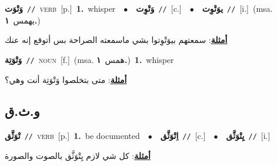 \documentclass[10pt,a4paper,twoside]{article} %
\begin{document}
\begin{multicols}{2}
{\setlength\topsep{0pt}\textbf{\foreignlanguage{arabic}{وَتْوَت}}\ {\color{gray}\texttt{//}\color{black}}\ \textsc{verb}\ [p.]\ \textbf{1.}~whisper\ \ $\bullet$\ \ \setlength\topsep{0pt}\textbf{\foreignlanguage{arabic}{وَتْوِت}}\ {\color{gray}\texttt{//}\color{black}}\ [c.]\ \ $\bullet$\ \ \setlength\topsep{0pt}\textbf{\foreignlanguage{arabic}{يوَتْوِت}}\ {\color{gray}\texttt{//}\color{black}}\ [i.]\ \color{gray}(msa. \foreignlanguage{arabic}{يهمس}~\foreignlanguage{arabic}{\textbf{١.}})\color{black}\  \begin{flushright}\color{gray}\foreignlanguage{arabic}{\textbf{\underline{\foreignlanguage{arabic}{أمثلة}}}: سمعتهم بيوَتْوِتوا بشي ماسمعته الصراحة بس أتوقع إنه عنك}\end{flushright}\color{black}} \vspace{2mm}

{\setlength\topsep{0pt}\textbf{\foreignlanguage{arabic}{وَتْوَتِة}}\ {\color{gray}\texttt{//}\color{black}}\ \textsc{noun}\ [f.]\ \color{gray}(msa. \foreignlanguage{arabic}{همس}~\foreignlanguage{arabic}{\textbf{١.}})\color{black}\ \textbf{1.}~whisper\  \begin{flushright}\color{gray}\foreignlanguage{arabic}{\textbf{\underline{\foreignlanguage{arabic}{أمثلة}}}: متى بتخلصوا وَتْوَتِة أنت وهي؟}\end{flushright}\color{black}} \vspace{2mm}

\vspace{-3mm}
\subsection*{\color{blue}\foreignlanguage{arabic}{و.ث.ق}\color{blue}{}} 

{\setlength\topsep{0pt}\textbf{\foreignlanguage{arabic}{تْوَثَّق}}\ {\color{gray}\texttt{//}\color{black}}\ \textsc{verb}\ [p.]\ \textbf{1.}~be documented\ \ $\bullet$\ \ \setlength\topsep{0pt}\textbf{\foreignlanguage{arabic}{اِتْوَثَّق}}\ {\color{gray}\texttt{//}\color{black}}\ [c.]\ \ $\bullet$\ \ \setlength\topsep{0pt}\textbf{\foreignlanguage{arabic}{يِتْوَثَّق}}\ {\color{gray}\texttt{//}\color{black}}\ [i.]\  \begin{flushright}\color{gray}\foreignlanguage{arabic}{\textbf{\underline{\foreignlanguage{arabic}{أمثلة}}}: كل شي لازم يِتْوَثَّق بالصوت والصورة}\end{flushright}\color{black}} \vspace{2mm}


\end{multicols}
\end{document}
